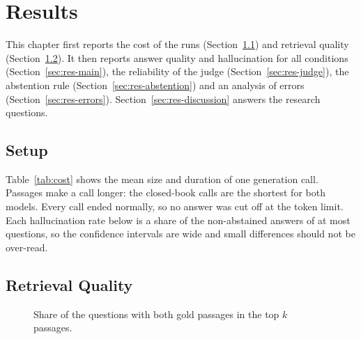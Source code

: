 \chapter{Results}\label{chap:results}

This chapter first reports the cost of the runs (Section~\ref{sec:res-setup}) and retrieval quality
(Section~\ref{sec:res-retrieval}). It then reports answer quality and hallucination for all conditions
(Section~\ref{sec:res-main}), the reliability of the judge (Section~\ref{sec:res-judge}), the abstention
rule (Section~\ref{sec:res-abstention}) and an analysis of errors (Section~\ref{sec:res-errors}).
Section~\ref{sec:res-discussion} answers the research questions.

\section{Setup}\label{sec:res-setup}
Table~\ref{tab:cost} shows the mean size and duration of one generation call. Passages make a call longer:
the closed-book calls are the shortest for both models. Every call ended normally, so no answer was cut off
at the token limit. Each hallucination rate below is a share of the non-abstained answers of at most
 questions, so the confidence intervals are wide and small differences should not be
over-read.

\begin{table}[htbp]
\centering\small
\caption{Generation cost per question: mean total tokens and mean latency of one call, and the share
of calls that ended normally (\texttt{finish\_reason} is \texttt{stop}).}\label{tab:cost}

\end{table}

\section{Retrieval Quality}\label{sec:res-retrieval}

\begin{table}[htbp]
\centering\small
\caption{Retrieval quality on all  questions and on the first
, which are the ones used for generation and judging.}\label{tab:retrieval}

\end{table}

\begin{figure}[htbp]
\centering
{}
\caption{Share of the  questions with both gold passages in the top $k$
passages.}\label{fig:retrieval}
\end{figure}

